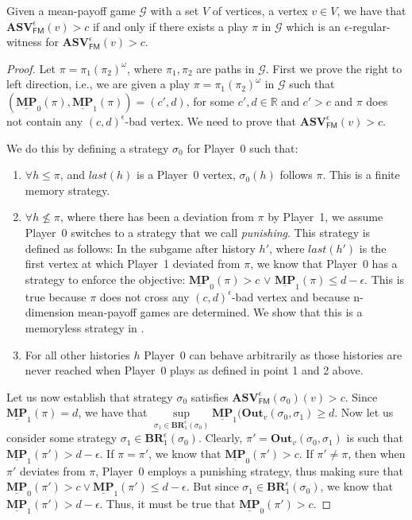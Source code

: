\begin{lemma}
\label{lemWitnessASVForFinStrat}
Given a mean-payoff game $\mathcal{G}$ with a set $V$ of vertices, a vertex $v \in V$, we have that $\mathbf{ASV}_{\mathsf{FM}}^{\epsilon}(v) > c$ if and only if there exists a play $\pi$ in $\mathcal{G}$ which is an $\epsilon$-regular-witness for $\mathbf{ASV}_{\mathsf{FM}}^{\epsilon}(v) > c$.
\end{lemma}
\begin{proof}
	Let $\pi = \pi_1 (\pi_2)^{\omega}$, where $\pi_1, \pi_2$ are paths in $\mathcal{G}$.
	First we prove the right to left direction, i.e., we are given a  play $\pi = \pi_1 (\pi_2)^{\omega}$ in $\mathcal{G}$ such that  $(\underline{\mathbf{MP}}_0(\pi), \underline{\mathbf{MP}}_1(\pi)) = (c', d)$, for some $c', d \in \mathbb{R}$ and $c' > c$ and $\pi$ does not contain any $(c,d)^{\epsilon}$-bad vertex. We need to prove that $\mathbf{ASV}_{\mathsf{FM}}^{\epsilon}(v) > c$.
	
	We do this by defining a strategy $\sigma_0$ for Player~0 such that:
	\begin{enumerate}
		\item $\forall h \leqslant \pi$, and $last(h)$ is a Player~0 vertex, $\sigma_0(h)$ follows $\pi$. This is a finite memory strategy.
		\item $\forall h \nleqslant \pi$, where there has been a deviation from $\pi$ by Player~1, we assume Player~0 switches to a strategy that we call \textit{punishing}. This strategy is defined as follows: In the subgame after history $h'$, where $last(h')$ is the first vertex at which Player~1 deviated from $\pi$, we know that Player~0 has a strategy to enforce the objective: $\underline{\mathbf{MP}}_0(\pi) > c$ $\lor$ $ \underline{\mathbf{MP}}_1(\pi) \leqslant d-\epsilon$. This is true because $\pi$ does not cross any $(c,d)^{\epsilon}$-bad vertex and because n-dimension mean-payoff games are determined. We show that this is a memoryless strategy in .
		\item For all other histories $h$ Player~0 can behave arbitrarily as those histories are never reached when Player~0 plays as defined in point 1 and 2 above.
	\end{enumerate}
	
	Let us now establish that strategy $\sigma_0$ satisfies $\mathbf{ASV}_{\mathsf{FM}}^{\epsilon}(\sigma_0)(v) > c$. Since $\underline{\mathbf{MP}}_1(\pi) = d$, we have that $\sup\limits_{\sigma_1 \in \mathbf{BR}^{\epsilon}_1(\sigma_0)} \underline{\mathbf{MP}}_1(\mathbf{Out}_v(\sigma_0, \sigma_1) \geqslant d$. Now let us consider some strategy $\sigma_1 \in \mathbf{BR}_1^{\epsilon}(\sigma_0)$. Clearly, $\pi' = \mathbf{Out}_v(\sigma_0, \sigma_1)$ is such that $\underline{\mathbf{MP}}_1(\pi') > d-\epsilon$. If $\pi = \pi'$, we know that $\underline{\mathbf{MP}}_0(\pi') > c$. If $\pi' \neq \pi$, then when $\pi'$ deviates from $\pi$, Player~0 employs a punishing strategy, thus making sure that $\underline{\mathbf{MP}}_0(\pi') > c \lor \underline{\mathbf{MP}}_1(\pi') \leqslant d - \epsilon$. But since $\sigma_1 \in \mathbf{BR}_1^{\epsilon}(\sigma_0)$, we know that $\underline{\mathbf{MP}}_1(\pi') > d - \epsilon$. Thus, it must be true that $\underline{\mathbf{MP}}_0(\pi') > c$.
	

\end{proof}
